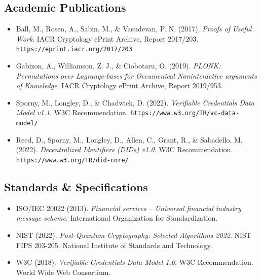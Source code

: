 \documentclass[11pt]{article}
\begin{document}

\subsection*{Academic Publications}

\begin{itemize}[leftmargin=*, label={}]
  \item Ball, M., Rosen, A., Sabin, M., \& Vasudevan, P. N. (2017). \textit{Proofs of Useful Work}. IACR Cryptology ePrint Archive, Report 2017/203. \texttt{https://eprint.iacr.org/2017/203}

  \item Gabizon, A., Williamson, Z. J., \& Ciobotaru, O. (2019). \textit{PLONK: Permutations over Lagrange-bases for Oecumenical Noninteractive arguments of Knowledge}. IACR Cryptology ePrint Archive, Report 2019/953.

  \item Sporny, M., Longley, D., \& Chadwick, D. (2022). \textit{Verifiable Credentials Data Model v1.1}. W3C Recommendation. \texttt{https://www.w3.org/TR/vc-data-model/}

  \item Reed, D., Sporny, M., Longley, D., Allen, C., Grant, R., \& Sabadello, M. (2022). \textit{Decentralized Identifiers (DIDs) v1.0}. W3C Recommendation. \texttt{https://www.w3.org/TR/did-core/}
\end{itemize}

\subsection*{Standards \& Specifications}

\begin{itemize}[leftmargin=*, label={}]
  \item ISO/IEC 20022 (2013). \textit{Financial services -- Universal financial industry message scheme}. International Organization for Standardization.

  \item NIST (2022). \textit{Post-Quantum Cryptography: Selected Algorithms 2022}. NIST FIPS 203-205. National Institute of Standards and Technology.

  \item W3C (2018). \textit{Verifiable Credentials Data Model 1.0}. W3C Recommendation. World Wide Web Consortium.
\end{itemize}
\end{document}
